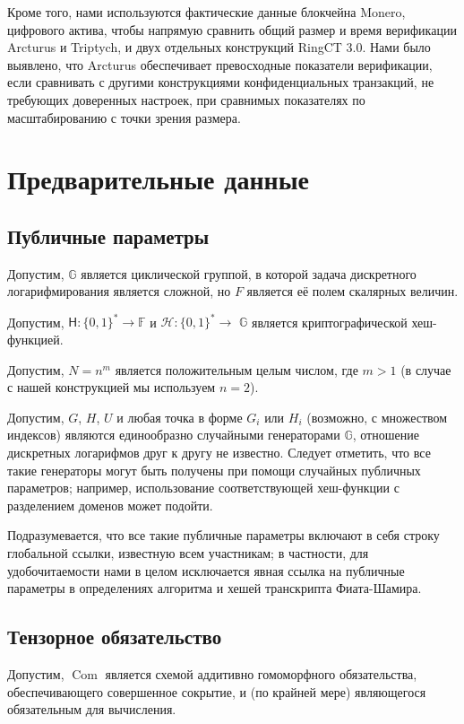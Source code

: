 \documentclass{article}
\newcommand{\F}{\mathbb{F}}
\newcommand{\hs}{\mathsf{H}}
\newcommand{\hp}{\mathcal{H}}
\newcommand{\com}{\operatorname{Com}}
\theoremstyle{definition}
\begin{document}
Кроме того, нами используются фактические данные блокчейна Monero, цифрового актива, чтобы напрямую сравнить общий размер и время верификации Arcturus и Triptych, и двух отдельных конструкций RingCT 3.0. Нами было выявлено, что Arcturus обеспечивает превосходные показатели верификации, если сравнивать с другими конструкциями конфиденциальных транзакций, не требующих доверенных настроек, при сравнимых показателях по масштабированию с точки зрения размера.


\section{Предварительные данные}

\subsection{Публичные параметры}
Допустим, \begin{math}\mathbb{G}\end{math} является циклической группой, в которой задача дискретного логарифмирования является сложной, но $F$ является её полем скалярных величин.

Допустим, $\hs: \{0,1\}^* \to \F$ и $\hp: \{0,1\}^* \to$ \begin{math}\mathbb{G}\end{math} является криптографической хеш-функцией.

Допустим, $N = n^m$ является положительным целым числом, где $m > 1$ (в случае с нашей конструкцией мы используем $n = 2$).

Допустим, $G$, $H$, $U$ и любая точка в форме $G_i$ или $H_i$ (возможно, с множеством индексов) являются единообразно случайными генераторами \begin{math}\mathbb{G}\end{math}, отношение дискретных логарифмов друг к другу не известно. Следует отметить, что все такие генераторы могут быть получены при помощи случайных публичных параметров; например, использование соответствующей хеш-функции с разделением доменов может подойти.

Подразумевается, что все такие публичные параметры включают в себя строку глобальной ссылки, известную всем участникам; в частности, для удобочитаемости нами в целом исключается явная ссылка на публичные параметры в определениях алгоритма и хешей транскрипта Фиата-Шамира.


\subsection{Тензорное обязательство}
Допустим, $\com$ является схемой аддитивно гомоморфного обязательства, обеспечивающего совершенное сокрытие, и (по крайней мере) являющегося обязательным для вычисления.
\end{document}
